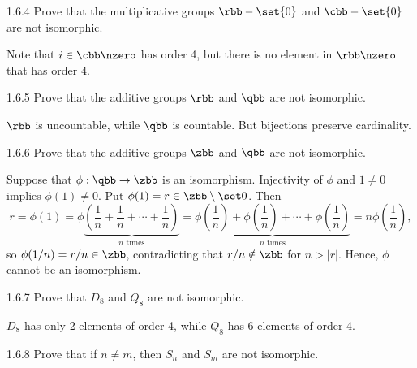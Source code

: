 \begin{exercise}{1.6.4}
    Prove that the multiplicative groups $\rbb - \set{0}$ and $\cbb- \set{0}$ are not isomorphic.
\end{exercise}

\begin{sol}
    Note that $i \in \cbb \nzero$ has order 4, but there is no element in $\rbb \nzero$ that has order 4.
\end{sol}

\begin{exercise}{1.6.5}
    Prove that the additive groups $\rbb$ and $\qbb$ are not isomorphic.
\end{exercise}

\begin{sol}
    $\rbb$ is uncountable, while $\qbb$ is countable.
	But bijections preserve cardinality.
\end{sol}

\begin{exercise}{1.6.6}
    Prove that the additive groups $\zbb$ and $\qbb$ are not isomorphic.

\end{exercise}

\begin{sol}
    Suppose that $\phi : \qbb \to \zbb$ is an isomorphism.
    Injectivity of $\phi$ and $1 \neq 0$ implies $\phi(1) \neq 0$.
    Put $\phi(1) = r \in \zbb \setminus \set 0$.
    Then
    \[
        r = \phi(1) = \phi\underbrace{\left(\frac{1}{n} + \frac{1}{n} + \cdots + \frac{1}{n}\right)}_{n\text{ times}} = \underbrace{\phi\left(\frac{1}{n}\right) + \phi\left(\frac{1}{n}\right) + \cdots + \phi\left(\frac{1}{n}\right)}_{n\text{ times}} = n\phi\left(\frac{1}{n}\right),
    \]
    so $\phi(1/n) = r/n \in \zbb$, contradicting that $r/n \notin \zbb$ for $n > |r|$.
    Hence, $\phi$ cannot be an isomorphism.
\end{sol}

\begin{exercise}{1.6.7}
    Prove that $D_8$ and $Q_8$ are not isomorphic.
\end{exercise}

\begin{sol}
    $D_8$ has only 2 elements of order 4, while $Q_8$ has 6 elements of order 4.
\end{sol}

\begin{exercise}{1.6.8}
    Prove that if $n \neq m$, then $S_n$ and $S_m$ are not isomorphic.
\end{exercise}

